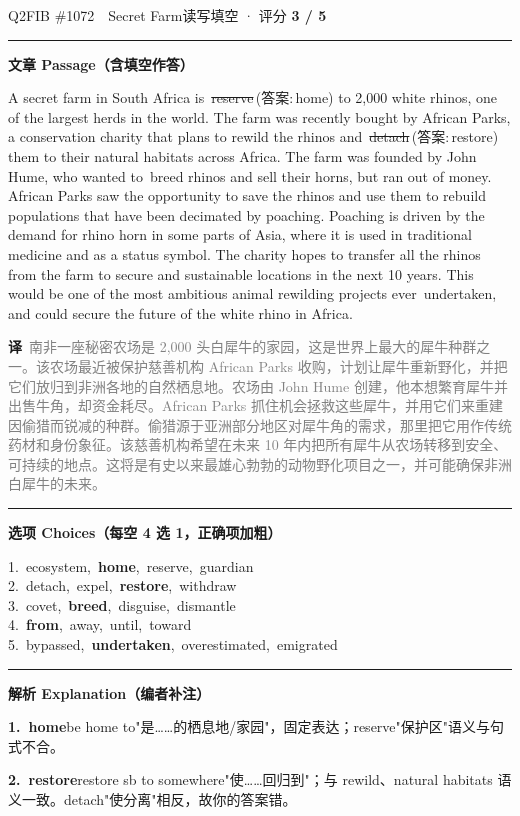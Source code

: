 \documentclass[11pt]{article}
\newcommand{\ptesub}[1]{%
  \par\needspace{2\baselineskip}\smallskip
  {\color{cAccent}\rule[-0.2ex]{3pt}{1.05em}}\hspace{6pt}%
  {\bfseries\color{cHead}#1}\par\nopagebreak\smallskip}
\newcommand{\zh}[1]{{\footnotesize\textcolor{cNote}{\textbf{译}}\ \textcolor{gray}{#1}}}
\newcommand{\rok}[1]{{\color{cFix}\ding{51}\,#1}}                 %
\newcommand{\rno}[2]{{\color{cWrong}\ding{55}\,\sout{#1}}\,{\footnotesize\color{cFix}(答案:\,#2)}}  %
\begin{document}
\begin{qblock}{Q2\quad FIB \#1072\ \ Secret Farm}{读写填空 · 评分 \textcolor{cAccent}{\bfseries 3 / 5}}
\ptesub{文章 Passage（含填空作答）}
\begin{promptbox}
A secret farm in South Africa is \rno{reserve}{home} to 2,000 white rhinos, one of the largest herds in the world. The farm was recently bought by African Parks, a conservation charity that plans to rewild the rhinos and \rno{detach}{restore} them to their natural habitats across Africa. The farm was founded by John Hume, who wanted to \rok{breed} rhinos and sell their horns, but ran out of money. African Parks saw the opportunity to save the rhinos and use them to rebuild populations that have been decimated by poaching. Poaching is driven by the demand for rhino horn in some parts of Asia, where it is used in traditional medicine and as a status symbol. The charity hopes to transfer all the rhinos \rok{from} the farm to secure and sustainable locations in the next 10 years. This would be one of the most ambitious animal rewilding projects ever \rok{undertaken}, and could secure the future of the white rhino in Africa.
\end{promptbox}
\zh{南非一座秘密农场是 2,000 头白犀牛的家园，这是世界上最大的犀牛种群之一。该农场最近被保护慈善机构 African Parks 收购，计划让犀牛重新野化，并把它们放归到非洲各地的自然栖息地。农场由 John Hume 创建，他本想繁育犀牛并出售牛角，却资金耗尽。African Parks 抓住机会拯救这些犀牛，并用它们来重建因偷猎而锐减的种群。偷猎源于亚洲部分地区对犀牛角的需求，那里把它用作传统药材和身份象征。该慈善机构希望在未来 10 年内把所有犀牛从农场转移到安全、可持续的地点。这将是有史以来最雄心勃勃的动物野化项目之一，并可能确保非洲白犀牛的未来。}
\ptesub{选项 Choices（每空 4 选 1，正确项加粗）}
{\small
1.\ ecosystem,\ \textbf{home},\ reserve,\ guardian\\
2.\ detach,\ expel,\ \textbf{restore},\ withdraw\\
3.\ covet,\ \textbf{breed},\ disguise,\ dismantle\\
4.\ \textbf{from},\ away,\ until,\ toward\\
5.\ bypassed,\ \textbf{undertaken},\ overestimated,\ emigrated}
\ptesub{解析 Explanation（编者补注）}
\begin{notebox}\footnotesize
\textbf{1.\ home}\quad be home to"是……的栖息地/家园"，固定表达；reserve"保护区"语义与句式不合。\par\smallskip
\textbf{2.\ restore}\quad restore sb to somewhere"使……回归到"；与 rewild、natural habitats 语义一致。detach"使分离"相反，故你的答案错。\par\smallskip

\end{notebox}
\end{qblock}
\end{document}
